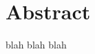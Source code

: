 \documentclass[12pt,twoside,a4paper,pdftex]{scrbook}
\begin{document}
\section{Abstract}
blah blah blah
\end{document}
